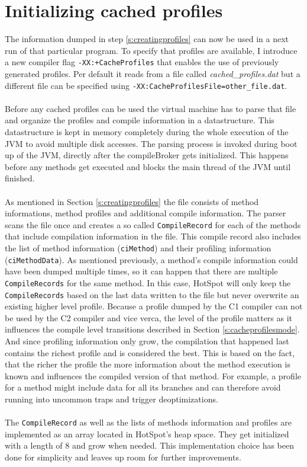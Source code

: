 \section{Initializing cached profiles}
\label{s:initializingprofiles}
The information dumped in step \ref{s:creatingprofiles} can now be used in a next run of that particular program.
To specify that profiles are available, I introduce a new compiler flag \texttt{-XX:+CacheProfiles} that enables the use of previously generated profiles. Per default it reads from a file called \textit{cached\_profiles.dat} but a different file can be specified using \texttt{-XX:CacheProfilesFile=other\_file.dat}.
\\\\
Before any cached profiles can be used the virtual machine has to parse that file and organize the profiles and compile information in a datastructure. This datastructure is kept in memory completely during the whole execution of the JVM to avoid multiple disk accesses.
The parsing process is invoked during boot up of the JVM, directly after the compileBroker gets initialized. This happens before any methods get executed and blocks the main thread of the JVM until finished.
\\\\
As mentioned in Section \ref{s:creatingprofiles} the file consists of method informations, method profiles and additional compile information. The parser scans the file once and creates a so called \texttt{CompileRecord} for each of the methods that include compilation information in the file. This compile record also includes the list of method information (\texttt{ciMethod}) and their profiling information (\texttt{ciMethodData}).
As mentioned previously, a method's compile information could have been dumped multiple times, so it can happen that there are multiple \texttt{CompileRecords} for the same method. In this case, HotSpot will only keep the \texttt{CompileRecords} based on the last data written to the file but never overwrite an existing higher level profile.
Because a profile dumped by the C1 compiler can not be used by the C2 compiler and vice verca, the level of the profile matters as it influences the compile level transitions described in Section \ref{s:cacheprofilesmode}.
And since profiling information only grow, the compilation that happened last contains the richest profile and is considered the best.
This is based on the fact, that the richer the profile the more information about the method execution is known and influences the compiled version of that method. For example, a profile for a method might include data for all its branches and can therefore avoid running into uncommon traps and trigger deoptimizations.
\\\\
The \texttt{CompileRecord} as well as the lists of methods information and profiles are implemented as an array located in HotSpot's heap space.
They get initialized with a length of 8 and grow when needed. This implementation choice has been done for simplicity and leaves up room for further improvements.


